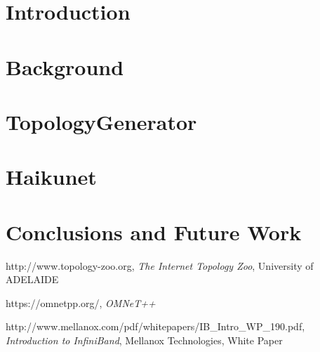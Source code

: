 \documentclass[11pt,a4paper,twoside]{tesis}
\begin{document}
\def\titulo{Licenciado }

\def\autor{Andrés Laurito}
\def\tituloTesis{Haikunet: \mbox{A SDN programming language}}
\def\runtitulo{Haikunet: A SDN programming language for debugging statically and dynamically the network}
\def\runtitle{Haikunet: A SDN programming language}
\def\director{Hernán Melgratti}
\def\codirector{Rodrigo Castro}
\def\lugar{Buenos Aires, 2017}


\frontmatter
\pagestyle{empty}


\cleardoublepage


\cleardoublepage


\cleardoublepage


\cleardoublepage

\renewcommand*\contentsname{Summary}

\tableofcontents

\mainmatter
\pagestyle{headings}


\chapter{Introduction}


\chapter{Background}


\chapter{TopologyGenerator}


\chapter{Haikunet}


\chapter{Conclusions and Future Work}


\backmatter

\begin{thebibliography}{9}
http://www.topology-zoo.org, \textit{The Internet Topology Zoo}, University of ADELAIDE 

https://omnetpp.org/, \textit{OMNeT++}

http://www.mellanox.com/pdf/whitepapers/IB\_Intro\_WP\_190.pdf, \textit{Introduction to InfiniBand}, Mellanox Technologies, White Paper


\end{thebibliography}
\end{document}
